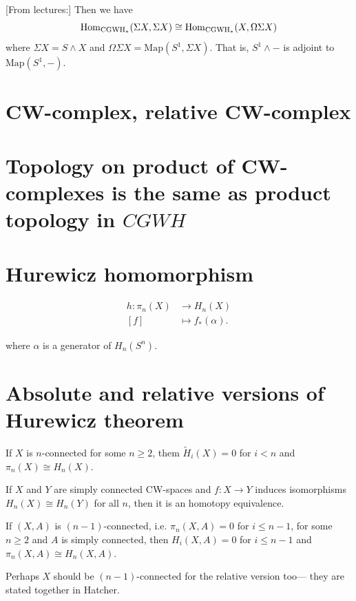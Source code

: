 [From lectures:] Then we have
$$\mathop{\mathrm{Hom}}\nolimits_{\text{CGWH}_*}(\Sigma X,\Sigma
X)\cong\mathop{\mathrm{Hom}}\nolimits_{\text{CGWH}_*}(X,\Omega\Sigma
X)$$
where $\Sigma X=S\wedge X$ and $\Omega\Sigma
X=\text{Map}(S^1,\Sigma X)$. That is,
$S^1\wedge-$ is adjoint to
$\text{Map}(S^1,-)$.

\section{CW-complex, relative CW-complex}
\label{section-cw-compl-relat-cw-compl}
\section{Topology on product of CW-complexes
is the same as product topology in $CGWH$}
\label{section-topol-produ-cw-compl}

\section{Hurewicz homomorphism}
\label{section-Hurewicz-homomorphism}

\begin{definition}
\label{definition-hurewicz-homomorphism}
$$
\begin{aligned}
h: \pi_{n}(X) &\longrightarrow H_{n}(X) \\
[f] &\longmapsto f_{*}(\alpha)
.\end{aligned}
$$
\end{definition}
where $\alpha$ is a generator of $
H_{n}(S^{n})$.

\section{Absolute and relative versions of
Hurewicz theorem}
\label{section-absol-relat-hurew-theor}

\begin{theorem}[Hurewicz]
\label{theorem-Hurewicz-absolute}
If $X$ is $n$-connected for some $n \geq 2$,
them $\tilde{H}_i(X)=0$ for $i<n$
and $\pi_{n}(X)\cong H_n(X)$.
\end{theorem}

\begin{lemma}
\label{lemma-hurew-homom-gives-homot-equiv}
If $X$ and $Y$ are simply connected CW-spaces
and  $f:X \to Y$ induces
isomorphisms $H_n(X) \cong H_n(Y)$ for all
$n$, then it is an homotopy
equivalence.
\end{lemma}

\begin{theorem}[Hurewicz]
\label{theorem-Hurewicz-relative}
If $(X,A)$ is $(n-1)$-connected, i.e.
$\pi_{n}(X,A)=0$ for $i \leq n-1$, for
some $n\geq 2$ and $A$ is simply connected,
then $H_i(X,A)=0$ for $i\leq n-1$
and $\pi_{n}(X,A)\cong H_n(X,A)$.
\end{theorem}
Perhaps $X$ should be $(n-1)$-connected for
the relative version too---
they are stated together in Hatcher.

